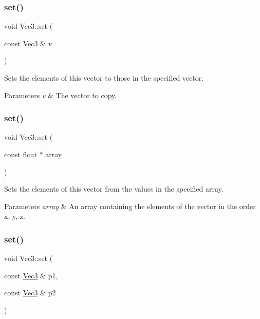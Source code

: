 \subsubsection{\texorpdfstring{set()}{set()}\hspace{0.1cm}{\footnotesize\ttfamily [4/8]}}
{\footnotesize\ttfamily void Vec3\+::set (\begin{DoxyParamCaption}\item[{const \hyperlink{classVec3}{Vec3} \&}]{v }\end{DoxyParamCaption})\hspace{0.3cm}{\ttfamily [inline]}}

Sets the elements of this vector to those in the specified vector.


\begin{DoxyParams}{Parameters}
{\em v} & The vector to copy. \\
\hline
\end{DoxyParams}
\mbox{\label{classVec3_a61237d7bfe731bd96235a3fe7aeaf6e7}} 
\subsubsection{\texorpdfstring{set()}{set()}\hspace{0.1cm}{\footnotesize\ttfamily [5/8]}}
{\footnotesize\ttfamily void Vec3\+::set (\begin{DoxyParamCaption}\item[{const float $\ast$}]{array }\end{DoxyParamCaption})\hspace{0.3cm}{\ttfamily [inline]}}

Sets the elements of this vector from the values in the specified array.


\begin{DoxyParams}{Parameters}
{\em array} & An array containing the elements of the vector in the order x, y, z. \\
\hline
\end{DoxyParams}
\mbox{\label{classVec3_af3cde4c257ab262d2f86c67a5ff0603b}} 
\subsubsection{\texorpdfstring{set()}{set()}\hspace{0.1cm}{\footnotesize\ttfamily [6/8]}}
{\footnotesize\ttfamily void Vec3\+::set (\begin{DoxyParamCaption}\item[{const \hyperlink{classVec3}{Vec3} \&}]{p1,  }\item[{const \hyperlink{classVec3}{Vec3} \&}]{p2 }\end{DoxyParamCaption})\hspace{0.3cm}{\ttfamily [inline]}}

